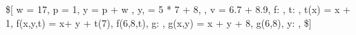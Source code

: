 \$[
w = 17,
p = 1,
y = \if p  + w ,
y,
\sigma = 5 * 7 + 8,
\sigma,
v = 6.7 + 8.9,
f: \Z \rightarrow \Z,
t: \Z \rightarrow \Z,
t(x) = x + 1,
f(x,y,t)  = x+ y + t(7),
f(6,8,t),
g: \Z \rightarrow \Z,
g(x,y) = x + y + 8,
g(6,8),
y: \R \rightarrow \R,
\$]
